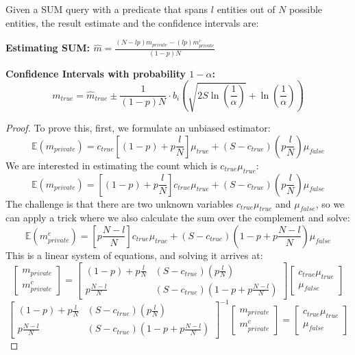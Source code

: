 \begin{theorem}
Given a SUM query with a predicate that spans $l$ entities out of $N$ possible entities, the result estimate and the confidence intervals are:

\noindent\textbf{Estimating SUM: \textmd{$\hat{m}=\frac{(N-lp)m_{private}-(lp)m_{private}^{c}}{(1-p)N}$}}

\noindent\textbf{Confidence Intervals with probability $1-\alpha$:} 
\[m_{true}=\hat{m}_{true}\pm\frac{1}{(1-p)N}\cdot b_{i}(\sqrt{2S\ln(\frac{1}{\alpha})}+\ln(\frac{1}{\alpha}))\]
\end{theorem}
\begin{proof}
To prove this, first, we formulate an unbiased estimator:
\[
\mathbb{E}(m_{private})=c_{true}[(1-p)+p\frac{l}{N}]\mu_{true}+(S-c_{true})(p\frac{l}{N})\mu_{false}
\]
We are interested in estimating the count which is $c_{true}\mu_{true}$:
\[
\mathbb{E}(m_{private})=[(1-p)+p\frac{l}{N}]c_{true}\mu_{true}+(S-c_{true})(p\frac{l}{N})\mu_{false}
\]
The challenge is that there are two unknown variables $c_{true}\mu_{true}$
and $\mu_{false}$, so we can apply a trick where we also calculate
the sum over the complement and solve:
\[
\mathbb{E}(m_{private}^{c})=[p\frac{N-l}{N}]c_{true}\mu_{true}+(S-c_{true})(1-p+p\frac{N-l}{N})\mu_{false}
\]
This is a linear system of equations, and solving it arrives at:
\[
\begin{bmatrix}m_{private}\\
m_{private}^{c}
\end{bmatrix}=\begin{bmatrix}(1-p)+p\frac{l}{N} & (S-c_{true})(p\frac{l}{N})\\
p\frac{N-l}{N} & (S-c_{true})(1-p+p\frac{N-l}{N})
\end{bmatrix}\begin{bmatrix}c_{true}\mu_{true}\\
\mu_{false}
\end{bmatrix}
\]
\[
\begin{bmatrix}(1-p)+p\frac{l}{N} & (S-c_{true})(p\frac{l}{N})\\
p\frac{N-l}{N} & (S-c_{true})(1-p+p\frac{N-l}{N})
\end{bmatrix}^{-1}\begin{bmatrix}m_{private}\\
m_{private}^{c}
\end{bmatrix}=\begin{bmatrix}c_{true}\mu_{true}\\
\mu_{false}
\end{bmatrix}
\]
\end{proof}
